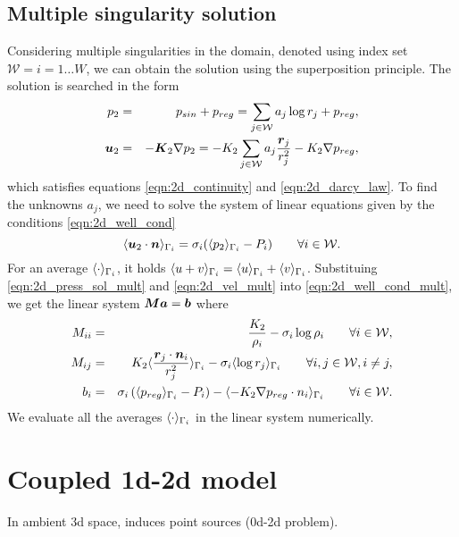   \subsection{Multiple singularity solution}
  Considering multiple singularities in the domain, denoted using index set $\mathcal{W}=i=1\ldots W$, we can obtain the solution using the superposition principle.
  The solution is searched in the form
  \begin{eqnarray}
    p_2 &=& p_{sin} + p_{reg} = \sum\limits_{j\in\mathcal{W}} a_j\log r_j + p_{reg}, \label{eqn:2d_press_sol_mult}\\
    \mathbf{\boldsymbol{u}}_2 &=& -\mathbf{\boldsymbol{K}}_2\nabla p_2 = -K_2 \sum\limits_{j\in\mathcal{W}} a_j\frac{\mathbf{\boldsymbol{r}}_j}{r_j^2} - K_2 \nabla p_{reg}, \label{eqn:2d_vel_mult}
  \end{eqnarray}
  which satisfies equations \eqref{eqn:2d_continuity} and \eqref{eqn:2d_darcy_law}.
  To find the unknowns $a_j$, we need to solve the system of linear equations given by the conditions \eqref{eqn:2d_well_cond}
  \begin{equation}
    \langle\mathbf{\boldsymbol{u}}_2 \cdot \mathbf{\boldsymbol{n}}\rangle_{\Gamma_i} = \sigma_i (\langle p_2\rangle_{\Gamma_i} - P_i) \qquad  \forall i\in\mathcal{W}. \label{eqn:2d_well_cond_mult}
  \end{equation}
  For an average $\langle\cdot\rangle_{\Gamma_i}$, it holds $\langle u+v\rangle_{\Gamma_i} = \langle u\rangle_{\Gamma_i} + \langle v\rangle_{\Gamma_i}$.
  Substituing \eqref{eqn:2d_press_sol_mult} and \eqref{eqn:2d_vel_mult} into \eqref{eqn:2d_well_cond_mult}, we get
  the linear system $\mathbf{\boldsymbol{M}}\mathbf{\boldsymbol{a}} = \mathbf{\boldsymbol{b}}$ where
  \begin{eqnarray}
    M_{ii} &=& \frac{K_2}{\rho_i} - \sigma_i\log\rho_i \qquad \forall i\in\mathcal{W},\\
    M_{ij} &=& K_2\langle\frac{\mathbf{\boldsymbol{r}}_j \cdot \mathbf{\boldsymbol{n}}_i}{r_j^2}\rangle_{\Gamma_i} - \sigma_i\langle\log r_j\rangle_{\Gamma_i} \qquad \forall i,j\in\mathcal{W}, i\neq j,\\
    b_{i} &=& \sigma_i\left(\langle p_{reg}\rangle_{\Gamma_i} - P_i \right) - \langle- K_2 \nabla p_{reg}\cdot n_i\rangle_{\Gamma_i} \qquad \forall i\in\mathcal{W}.
  \end{eqnarray}
  We evaluate all the averages $\langle\cdot\rangle_{\Gamma_i}$ in the linear system numerically.
  
\section{Coupled 1d-2d model}

In ambient 3d space, induces point sources (0d-2d problem).
  
